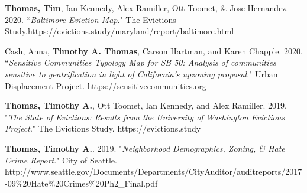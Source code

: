 \begin{cvparagraph}

\textbf{Thomas, Tim}, Ian Kennedy, Alex Ramiller, Ott Toomet, \& Jose Hernandez. 2020. “\emph{Baltimore Eviction Map}." The Evictions Study.\newline https://evictions.study/maryland/report/baltimore.html
\end{cvparagraph}

\begin{cvparagraph}

Cash, Anna, \textbf{Timothy A. Thomas}, Carson Hartman, and Karen Chapple. 2020. “\emph{Sensitive Communities Typology Map for SB 50: Analysis of communities sensitive to gentrification in light of California's upzoning proposal}." Urban Displacement Project. https://sensitivecommunities.org
\end{cvparagraph}

\begin{cvparagraph}

\textbf{Thomas, Timothy A.}, Ott Toomet, Ian Kennedy, and Alex Ramiller. 2019. "\emph{The State of Evictions: Results from the University of Washington Evictions Project}." The Evictions Study. https://evictions.study
\end{cvparagraph}

\begin{cvparagraph}

\textbf{Thomas, Timothy A.}. 2019. "\emph{Neighborhood Demographics, Zoning, & Hate Crime Report}." City of Seattle. http://www.seattle.gov/Documents/Departments\newline/CityAuditor/auditreports/2017-09\%20Hate\%20Crimes\%20Ph2\_Final.pdf
\end{cvparagraph}